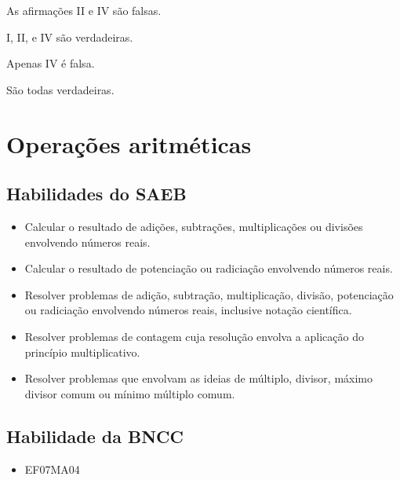 \begin{escolha}
\item
  As afirmações II e IV são falsas.
\item
  I, II, e IV são verdadeiras.
\item
  Apenas IV é falsa.
\item
  São todas verdadeiras.
\end{escolha}



\chapter{Operações aritméticas}

\section{Habilidades do SAEB }

\begin{itemize}
\item Calcular o resultado de adições, subtrações,
multiplicações ou divisões envolvendo números reais.
\item
  Calcular o resultado de potenciação ou radiciação envolvendo números
  reais.
\item
  Resolver problemas de adição, subtração, multiplicação, divisão,
  potenciação ou radiciação envolvendo números reais, inclusive notação
  científica.
\item
  Resolver problemas de contagem cuja resolução envolva a aplicação do
  princípio multiplicativo.
\item
  Resolver problemas que envolvam as ideias de múltiplo, divisor, máximo
  divisor comum ou mínimo múltiplo comum.
\end{itemize}

\section{Habilidade da BNCC }
\begin{itemize}
\item EF07MA04
\end{itemize}

